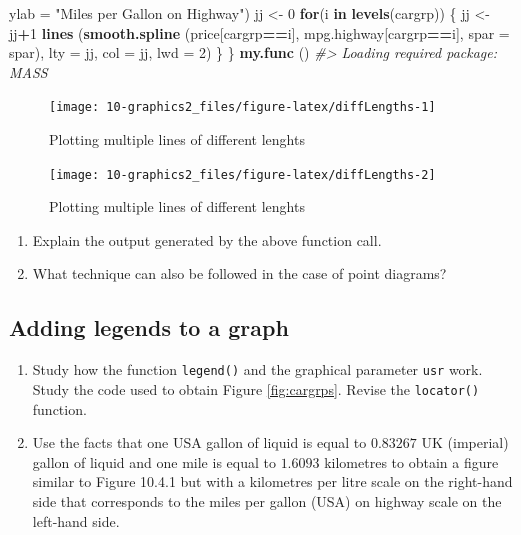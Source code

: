 \documentclass[
]{book}
\newenvironment{Shaded}{\begin{snugshade}}{\end{snugshade}}
\newcommand{\AttributeTok}[1]{\textcolor[rgb]{0.13,0.29,0.53}{#1}}
\newcommand{\CommentTok}[1]{\textcolor[rgb]{0.56,0.35,0.01}{\textit{#1}}}
\newcommand{\ControlFlowTok}[1]{\textcolor[rgb]{0.13,0.29,0.53}{\textbf{#1}}}
\newcommand{\DecValTok}[1]{\textcolor[rgb]{0.00,0.00,0.81}{#1}}
\newcommand{\FunctionTok}[1]{\textcolor[rgb]{0.13,0.29,0.53}{\textbf{#1}}}
\newcommand{\NormalTok}[1]{#1}
\newcommand{\OtherTok}[1]{\textcolor[rgb]{0.56,0.35,0.01}{#1}}
\newcommand{\SpecialCharTok}[1]{\textcolor[rgb]{0.81,0.36,0.00}{\textbf{#1}}}
\newcommand{\StringTok}[1]{\textcolor[rgb]{0.31,0.60,0.02}{#1}}
\begin{document}
\begin{Shaded}
\begin{Highlighting}[]
       \AttributeTok{ylab =} \StringTok{"Miles per Gallon on Highway"}\NormalTok{)}
\NormalTok{  jj }\OtherTok{\textless{}{-}} \DecValTok{0}
  \ControlFlowTok{for}\NormalTok{(i }\ControlFlowTok{in} \FunctionTok{levels}\NormalTok{(cargrp))}
\NormalTok{    \{  jj }\OtherTok{\textless{}{-}}\NormalTok{ jj}\SpecialCharTok{+}\DecValTok{1}
       \FunctionTok{lines}\NormalTok{ (}\FunctionTok{smooth.spline}\NormalTok{ (price[cargrp}\SpecialCharTok{==}\NormalTok{i], mpg.highway[cargrp}\SpecialCharTok{==}\NormalTok{i], }
                             \AttributeTok{spar =}\NormalTok{ spar),}
              \AttributeTok{lty =}\NormalTok{ jj, }\AttributeTok{col =}\NormalTok{ jj, }\AttributeTok{lwd =} \DecValTok{2}\NormalTok{)}
\NormalTok{    \}}
\NormalTok{\}}
\FunctionTok{my.func}\NormalTok{ ()}
\CommentTok{\#\textgreater{} Loading required package: MASS}
\end{Highlighting}
\end{Shaded}

\begin{figure}
\texttt{[image: 10-graphics2\_files/figure-latex/diffLengths-1]} \caption{Plotting multiple lines of different lenghts}\label{fig:diffLengths-1}
\end{figure}
\begin{figure}
\texttt{[image: 10-graphics2\_files/figure-latex/diffLengths-2]} \caption{Plotting multiple lines of different lenghts}\label{fig:diffLengths-2}
\end{figure}

\begin{enumerate}
\def\labelenumi{(\alph{enumi})}
\item
  Explain the output generated by the above function call.
\item
  What technique can also be followed in the case of point diagrams?
\end{enumerate}

\subsection{Adding legends to a graph}\label{Legends}

\begin{enumerate}
\def\labelenumi{(\alph{enumi})}
\item
  Study how the function \texttt{legend()} and the graphical parameter \texttt{usr} work. Study the code used to obtain Figure \ref{fig:cargrps}. Revise the \texttt{locator()} function.
\item
  Use the facts that one USA gallon of liquid is equal to \(0.83267\) UK (imperial) gallon of liquid and one mile is equal to \(1.6093\) kilometres to obtain a figure similar to Figure 10.4.1 but with a kilometres per litre scale on the right-hand side that corresponds to the miles per gallon (USA) on highway scale on the left-hand side.
\end{enumerate}
\end{document}
